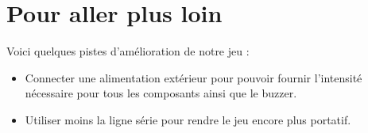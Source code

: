 \documentclass[10pt,a4,french]{article}
\begin{document}
\section{Pour aller plus loin}

Voici quelques pistes d'amélioration de notre jeu :

\begin{itemize}
	\item Connecter une alimentation extérieur pour pouvoir fournir l'intensité nécessaire pour tous les composants ainsi que le buzzer.
	\item Utiliser moins la ligne série pour rendre le jeu encore plus portatif.
\end{itemize}
\end{document}
